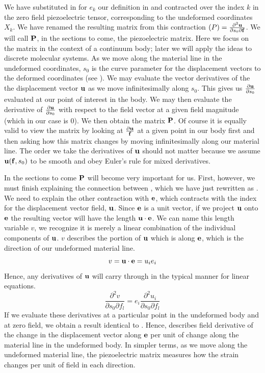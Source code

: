 We have substituted in for $e_k$ our definition in  and contracted over the index $k$ in the zero field piezoelectric tensor, 
corresponding to the undeformed coordinates $X_k$. 
We have renamed the resulting matrix from this contraction ${\mathbf (}P)=\frac{\partial^2{\mathbf u}}{\partial s_0 \partial {\mathbf f}}$.  
We will call ${\bf{P}}$, in the sections to come, the piezoelectric matrix.  
Here we focus on the matrix in the context of a continuum body; later we will apply the ideas to discrete molecular systems.
As we move along the material line in the undeformed coordinates, $s_0$ is the curve parameter for the displacement vectors to the deformed coordinates (see ).  
We may evaluate the vector derivatives of the the displacement vector ${\mathbf u}$ as we move infinitesimally along $s_0$.  
This gives us $\frac{\partial {\mathbf u}}{\partial s_0}$ evaluated
at our point of interest in the body.  
We may then evaluate the derivative of $\frac{\partial {\mathbf u}}{\partial s_0}$ with respect to the field vector at a 
given field magnitude (which in our case is $0$).  
We then obtain the matrix ${\mathbf P}$.  
Of course it is equally valid to view the matrix by looking at $\frac{\partial {\mathbf u}}{{\mathbf f}}$ at a given point in our body first and 
then asking how this matrix changes by moving infinitesimally along our material line.  
The order we take the derivatives of ${\mathbf u}$ should not matter because we assume 
${\mathbf u}({\mathbf f},s_0)$ to be smooth and obey Euler's rule for mixed derivatives.  

In the sections to come ${\mathbf P}$ will become very important for us.  
First, however, we must finish explaining the connection between , which we have just rewritten
as .  
We need to explain the other contraction with ${\mathbf e}$, which contracts with the index for the displacement vector field, ${\mathbf u}$.  
Since ${\mathbf e}$ is a unit vector, if we project ${\mathbf u}$ onto ${\mathbf e}$ the resulting vector will have the length ${\mathbf u}\cdot {\mathbf e}$. 
We can name this length variable $v$, we recognize it is merely a linear combination
of the individual components of ${\mathbf u}$.  $
v$ describes the portion of ${\mathbf u}$ which is along ${\mathbf e}$, which is the direction of our undeformed material line.  
\begin{equation}
 v = {\mathbf u}\cdot {\mathbf e} = u_i e_i
\end{equation}
Hence, any derivatives of ${\mathbf u}$ will carry through in the typical manner for linear equations.
\begin{equation}
\label{eq:prevWork}
 \frac{\partial^2 v}{\partial s_0 \partial f_l} =  e_i \frac{\partial^2 u_i}{\partial s_0 \partial f_l}
\end{equation}
If we evaluate these derivatives at a particular point in the undeformed body and at zero field, we obtain a result identical to .  
Hence,  describes field derivative of the change 
in the displacement vector along ${\mathbf e}$ per unit of change along the material line in the undeformed body.  
In simpler terms, as we move along the undeformed material line,
the piezoelectric matrix measures how the strain changes per unit of field in each direction.  


